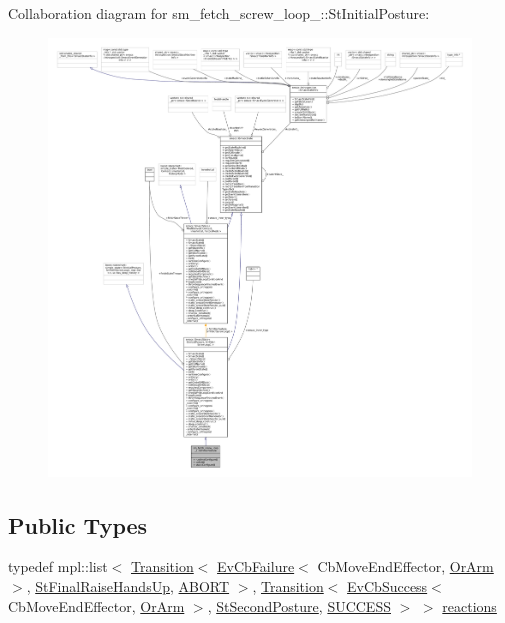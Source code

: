 Collaboration diagram for sm\+\_\+fetch\+\_\+screw\+\_\+loop\+\_\+:\+:St\+Initial\+Posture\+:
\nopagebreak
\begin{figure}[H]
\begin{center}
\leavevmode
\includegraphics[width=350pt]{structsm__fetch__screw__loop__1_1_1StInitialPosture__coll__graph}
\end{center}
\end{figure}
\subsection*{Public Types}
\begin{DoxyCompactItemize}
\item 
typedef mpl\+::list$<$ \hyperlink{classsmacc_1_1Transition}{Transition}$<$ \hyperlink{structsmacc_1_1EvCbFailure}{Ev\+Cb\+Failure}$<$ Cb\+Move\+End\+Effector, \hyperlink{classsm__fetch__screw__loop__1_1_1OrArm}{Or\+Arm} $>$, \hyperlink{structsm__fetch__screw__loop__1_1_1StFinalRaiseHandsUp}{St\+Final\+Raise\+Hands\+Up}, \hyperlink{structsmacc_1_1default__transition__tags_1_1ABORT}{A\+B\+O\+RT} $>$, \hyperlink{classsmacc_1_1Transition}{Transition}$<$ \hyperlink{structsmacc_1_1EvCbSuccess}{Ev\+Cb\+Success}$<$ Cb\+Move\+End\+Effector, \hyperlink{classsm__fetch__screw__loop__1_1_1OrArm}{Or\+Arm} $>$, \hyperlink{structsm__fetch__screw__loop__1_1_1StSecondPosture}{St\+Second\+Posture}, \hyperlink{structsmacc_1_1default__transition__tags_1_1SUCCESS}{S\+U\+C\+C\+E\+SS} $>$ $>$ \hyperlink{structsm__fetch__screw__loop__1_1_1StInitialPosture_a934e72dcb94334528eecd0dd4e1251f0}{reactions}
\end{DoxyCompactItemize}
